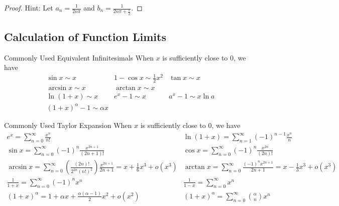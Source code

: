 \begin{proof}
  Hint: Let $a_n = \frac{1}{2n\pi}$ and $b_n = \frac{1}{2n\pi + \frac{\pi}{2}}$.
\end{proof}

\subsection{Calculation of Function Limits}

\begin{proposition}{Commonly Used Equivalent Infinitesimals}{}
  When $x$ is sufficiently close to $0$, we have
  \begin{equation}
    \begin{array}{lll}
      \sin x \sim x &1 - \cos x \sim \frac{1}{2}x^2 &\tan x \sim x\\
      \arcsin x \sim x & \arctan x \sim x&\\
      \ln(1 + x)\sim x & e^x - 1 \sim x& a^x - 1 \sim x \ln a\\
      (1 + x)^{\alpha} - 1 \sim \alpha x&&
    \end{array}
  \end{equation}
\end{proposition}

\begin{proposition}{Commonly Used Taylor Expansion}{}
  When $x$ is sufficiently close to $0$, we have
  \begin{equation}
    \begin{array}{ll}
    e^x = \sum\limits_{n = 0 }^{\infty}\frac{x^n}{n!}& \ln(1 + x) = \sum\limits_{n = 1}^{\infty}(-1)^{n-1}\frac{x^n}{n} \\
    \sin x = \sum\limits_{n = 0}^{\infty}(-1)^n \frac{x^{2n+1}}{(2n+1)!}& \cos x = \sum\limits_{n = 0}^{\infty}(-1)^n \frac{x^{2n}}{(2n)!} \\
    \arcsin x =\sum\limits_{n = 0}^{\infty}\left( \frac{(2n)!}{2^{2n}(n!)^2} \right)\frac{x^{2n+1}}{2n+1} =  x + \frac{1}{6}x^3 + o(x^3) &\arctan x = \sum\limits_{n = 0}^{\infty} \frac{(-1)^nx^{2n+1}}{2n+1} = x - \frac{1}{3}x^3 + o(x^3) \\
    \frac{1}{1+x} = \sum\limits_{n = 0}^{\infty}(-1)^n x^n&\frac{1}{1 - x} = \sum\limits_{n = 0}^{\infty}x^n \\
    (1+x)^{\alpha} = 1 + \alpha x + \frac{\alpha(\alpha - 1)}{2}x^2 + o(x^2)&(1 + x)^{\alpha} = \sum\limits_{n = 0}^{\infty}{\alpha \choose n} x^n
  \end{array}
  \end{equation}
\end{proposition}

